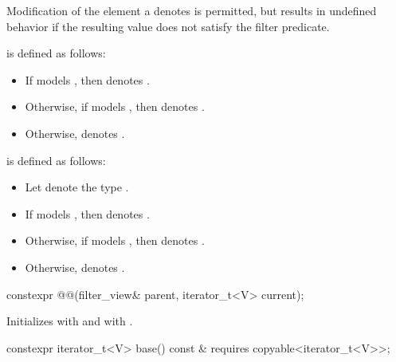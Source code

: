 \pnum
Modification of the element a  denotes is
permitted, but results in undefined behavior if the resulting value does not
satisfy the filter predicate.

\pnum
{} is defined as follows:
\begin{itemize}
\item If  models , then
 denotes .

\item Otherwise, if  models , then
 denotes .

\item Otherwise,  denotes .
\end{itemize}

\pnum
{} is defined as follows:
\begin{itemize}
\item Let  denote the type
.

\item If  models
,
then  denotes .

\item Otherwise, if   models
,
then  denotes .

\item Otherwise,  denotes .
\end{itemize}

%
\begin{itemdecl}
constexpr @@(filter_view& parent, iterator_t<V> current);
\end{itemdecl}

\begin{itemdescr}
\pnum
\effects
Initializes  with  and
 with .
\end{itemdescr}

%
\begin{itemdecl}
constexpr iterator_t<V> base() const &
  requires copyable<iterator_t<V>>;
\end{itemdecl}

